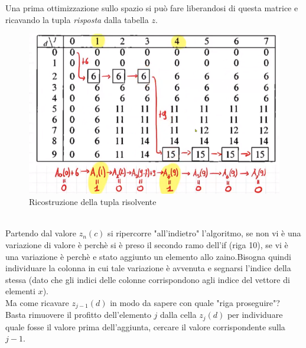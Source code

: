 \documentclass[a4paper]{article}
\begin{document}
Una prima ottimizzazione sullo spazio si può fare liberandosi di questa matrice e ricavando la tupla \textit{risposta} dalla tabella $z$.\\
\begin{figure}[!ht]
\centering
\includegraphics[width=1\textwidth]{./img/D2_ricavo}
\caption{Ricostruzione della tupla risolvente} \label{FIG:D2_ricavo}
\end{figure}\\
Partendo dal valore $z_n(c)$ si ripercorre "all'indietro" l'algoritmo, se non vi è una variazione di valore è perchè si è preso il secondo ramo dell'if (riga 10), se vi è una variazione è perchè e stato aggiunto un elemento allo zaino.Bisogna quindi individuare la colonna in cui tale variazione è avvenuta e segnarsi l'indice della stessa (dato che gli indici delle colonne corrispondono agli indice del vettore di elementi $x$).\\
Ma come ricavare $z_{j-1}(d)$ in modo da sapere con quale "riga proseguire"? Basta rimuovere il profitto dell'elemento $j$ dalla cella $z_{j}(d)$ per individuare quale fosse il valore prima dell'aggiunta, cercare il valore corrispondente sulla $j-1$.
\end{document}
